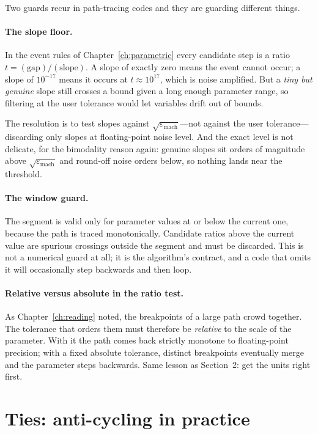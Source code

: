 Two guards recur in path-tracing codes and they are guarding different things.

\paragraph{The slope floor.} In the event rules of Chapter~\ref{ch:parametric} every
candidate step is a ratio $t = (\text{gap})/(\text{slope})$. A slope of exactly zero
means the event cannot occur; a slope of $10^{-17}$ means it occurs at
$t \approx 10^{17}$, which is noise amplified. But a \emph{tiny but genuine} slope still
crosses a bound given a long enough parameter range, so filtering at the user tolerance
would let variables drift out of bounds.

The resolution is to test slopes against $\sqrt{\varepsilon_{\mathrm{mach}}}$---not
against the user tolerance---discarding only slopes at floating-point noise level. And
the exact level is not delicate, for the bimodality reason again: genuine slopes sit
orders of magnitude above $\sqrt{\varepsilon_{\mathrm{mach}}}$ and round-off noise
orders below, so nothing lands near the threshold.

\paragraph{The window guard.} The segment is valid only for parameter values at or below
the current one, because the path is traced monotonically. Candidate ratios above the
current value are spurious crossings outside the segment and must be discarded. This is
not a numerical guard at all; it is the algorithm's contract, and a code that omits it
will occasionally step backwards and then loop.

\paragraph{Relative versus absolute in the ratio test.} As Chapter~\ref{ch:reading}
noted, the breakpoints of a large path crowd together. The tolerance that orders them
must therefore be \emph{relative} to the scale of the parameter. With it the path comes
back strictly monotone to floating-point precision; with a fixed absolute tolerance,
distinct breakpoints eventually merge and the parameter steps backwards. Same lesson as
Section~2: get the units right first.

\section{Ties: anti-cycling in practice}

